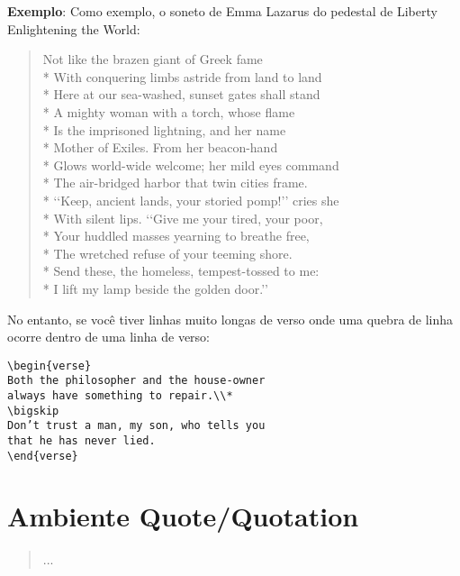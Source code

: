 \textbf{Exemplo}: Como exemplo, o soneto de Emma Lazarus do pedestal de Liberty Enlightening the World:
\begin{verbnobox}[\hspace{1in}]
\begin{verse}
Not like the brazen giant of Greek fame\\*
With conquering limbs astride from land to land\\*
Here at our sea-washed, sunset gates shall stand\\*
A mighty woman with a torch, whose flame\\*
Is the imprisoned lightning, and her name\\*
Mother of Exiles. From her beacon-hand\\*
Glows world-wide welcome; her mild eyes command\\*
The air-bridged harbor that twin cities frame.\\*
‘‘Keep, ancient lands, your storied pomp!’’ cries she\\*
With silent lips. ‘‘Give me your tired, your poor,\\*
Your huddled masses yearning to breathe free,\\*
The wretched refuse of your teeming shore.\\*
Send these, the homeless, tempest-tossed to me:\\*
I lift my lamp beside the golden door.’’
\end{verse} 
\end{verbnobox}

No entanto, se você tiver linhas muito longas de verso onde uma quebra de linha ocorre dentro de uma linha de verso:

\begin{verbatim}
\begin{verse}
Both the philosopher and the house-owner
always have something to repair.\\*
\bigskip
Don’t trust a man, my son, who tells you
that he has never lied.
\end{verse}
\end{verbatim}

\section{Ambiente Quote/Quotation}

\begin{verbnobox}[\hspace{1in}]
    \begin{quotation}...\end{quotation} 
\end{verbnobox}

